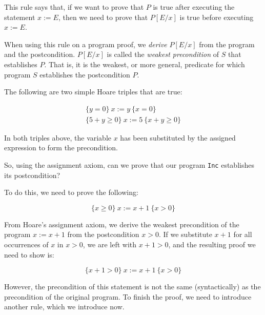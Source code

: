 This rule says that, if we want to prove that \(P\) is true after executing the statement \(x := E\), then we need to prove that \(P[E/x]\) is true before executing \(x := E\). 

When using this rule on a program proof, we \emph{derive} \(P[E/x]\) from the program and the postcondition. \(P[E/x]\) is called the {\em weakest precondition} of \(S\) that establishes \(P\).  That is, it is the weakest, or more general, predicate for which program \(S\) establishes the postcondition \(P\).

\begin{example}
The following are two simple Hoare triples that are true:

\begin{displaymath}
\begin{array}{l}
 \{y=0\}~ x := y~ \{x = 0\}\\[2mm]
  \{ 5 + y \geq 0\}~ x := 5~ \{x + y \geq 0\}
\end{array}
\end{displaymath}

In both triples above,  the variable \(x\) has been substituted by the assigned expression to form the precondition.

\end{example}

\begin{example}
So, using the assignment axiom, can we prove that our program {\tt Inc} establishes its postcondition?

To do this, we need to prove the following:

\begin{displaymath}
  \{x \geq 0\}~ x := x + 1~ \{x > 0\}
\end{displaymath}

From Hoare's assignment axiom, we derive the weakest precondition of the program $x := x + 1$ from the postcondition $x > 0$. If we substitute $x + 1$ for all occurrences of $x$ in $x > 0$, we are left with $x + 1 > 0$, and the resulting proof we need to show is:

\begin{displaymath}
  \{x + 1 > 0\}~ x := x + 1~ \{x > 0\}
\end{displaymath}

However, the precondition of this statement is not the same (syntactically) as the precondition of the original program. To finish the proof, we need to introduce another rule, which we introduce now.

\end{example}


